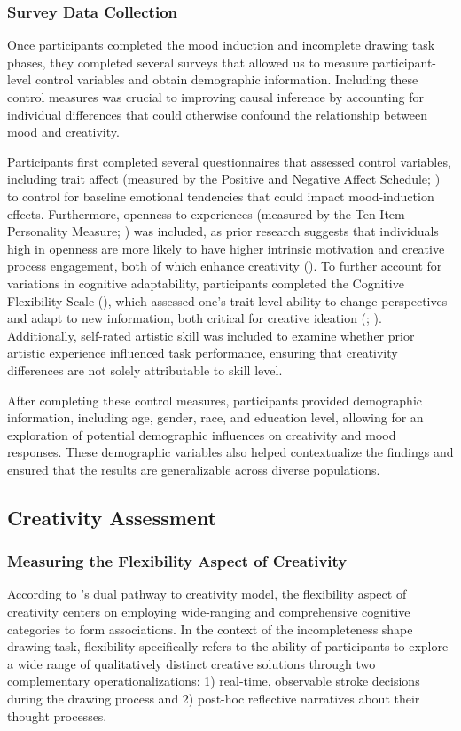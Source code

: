\documentclass[../MA_Thesis.tex]{subfiles}
\begin{document}
\subsubsection*{Survey Data Collection}
Once participants completed the mood induction and incomplete drawing task phases, they completed several surveys that allowed us to measure participant-level control variables and obtain demographic information. Including these control measures was crucial to improving causal inference by accounting for individual differences that could otherwise confound the relationship between mood and creativity.

Participants first completed several questionnaires that assessed control variables, including trait affect (measured by the Positive and Negative Affect Schedule; \cite{watson_development_1988}) to control for baseline emotional tendencies that could impact mood-induction effects. Furthermore, openness to experiences (measured by the Ten Item Personality Measure; \cite{gosling_very_2003}) was included, as prior research suggests that individuals high in openness are more likely to have higher intrinsic motivation and creative process engagement, both of which enhance creativity (\cite{tan_openness_2019}). To further account for variations in cognitive adaptability, participants completed the Cognitive Flexibility Scale (\cite{martin_new_1995}), which assessed one's trait-level ability to change perspectives and adapt to new information, both critical for creative ideation (\cite{lin_how_2014}; \cite{muller_concentrative_2016}). Additionally, self-rated artistic skill was included to examine whether prior artistic experience influenced task performance, ensuring that creativity differences are not solely attributable to skill level.

After completing these control measures, participants provided demographic information, including age, gender, race, and education level, allowing for an exploration of potential demographic influences on creativity and mood responses. These demographic variables also helped contextualize the findings and ensured that the results are generalizable across diverse populations. 

\subsection*{Creativity Assessment}
\subsubsection*{Measuring the Flexibility Aspect of Creativity}
According to \textcite{nijstad_dual_2010}'s dual pathway to creativity model, the flexibility aspect of creativity centers on employing wide-ranging and comprehensive cognitive categories to form associations. In the context of the incompleteness shape drawing task, flexibility specifically refers to the ability of participants to explore a wide range of qualitatively distinct creative solutions through two complementary operationalizations: 1) real-time, observable stroke decisions during the drawing process and 2) post-hoc reflective narratives about their thought processes.
\end{document}
